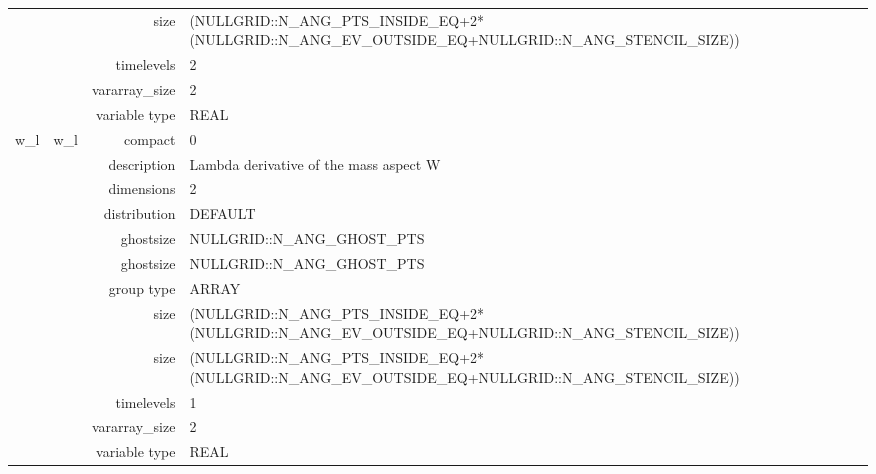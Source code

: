 \begin{tabular*}{150mm}{|c|c@{\extracolsep{\fill}}|rl|}
& ~ & size & (NULLGRID::N\_ANG\_PTS\_INSIDE\_EQ+2*(NULLGRID::N\_ANG\_EV\_OUTSIDE\_EQ+NULLGRID::N\_ANG\_STENCIL\_SIZE)) \\ 
 &  & timelevels & 2 \\ 
 &  & vararray\_size & 2 \\ 
 &  & variable type & REAL \\ 
\hline 
w\_l & w\_l & compact & 0 \\ 
 &  & description & Lambda derivative of the mass aspect W \\ 
 &  & dimensions & 2 \\ 
 &  & distribution & DEFAULT \\ 
 &  & ghostsize & NULLGRID::N\_ANG\_GHOST\_PTS \\ 
& ~ & ghostsize & NULLGRID::N\_ANG\_GHOST\_PTS \\ 
 &  & group type & ARRAY \\ 
 &  & size & (NULLGRID::N\_ANG\_PTS\_INSIDE\_EQ+2*(NULLGRID::N\_ANG\_EV\_OUTSIDE\_EQ+NULLGRID::N\_ANG\_STENCIL\_SIZE)) \\ 
& ~ & size & (NULLGRID::N\_ANG\_PTS\_INSIDE\_EQ+2*(NULLGRID::N\_ANG\_EV\_OUTSIDE\_EQ+NULLGRID::N\_ANG\_STENCIL\_SIZE)) \\ 
 &  & timelevels & 1 \\ 
 &  & vararray\_size & 2 \\ 
 &  & variable type & REAL \\ 
\hline 
\end{tabular*} 



\vspace{5mm}
\vspace{5mm}

